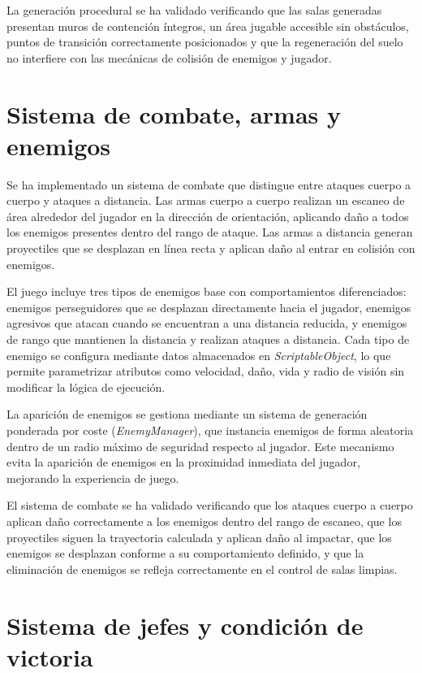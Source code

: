 La generación procedural se ha validado verificando que las salas generadas presentan muros de contención íntegros, un área jugable accesible sin obstáculos, puntos de transición correctamente posicionados y que la regeneración del suelo no interfiere con las mecánicas de colisión de enemigos y jugador.

\section{Sistema de combate, armas y enemigos}

Se ha implementado un sistema de combate que distingue entre ataques cuerpo a cuerpo y ataques a distancia. Las armas cuerpo a cuerpo realizan un escaneo de área alrededor del jugador en la dirección de orientación, aplicando daño a todos los enemigos presentes dentro del rango de ataque. Las armas a distancia generan proyectiles que se desplazan en línea recta y aplican daño al entrar en colisión con enemigos.

El juego incluye tres tipos de enemigos base con comportamientos diferenciados: enemigos perseguidores que se desplazan directamente hacia el jugador, enemigos agresivos que atacan cuando se encuentran a una distancia reducida, y enemigos de rango que mantienen la distancia y realizan ataques a distancia. Cada tipo de enemigo se configura mediante datos almacenados en \textit{ScriptableObject}, lo que permite parametrizar atributos como velocidad, daño, vida y radio de visión sin modificar la lógica de ejecución.

La aparición de enemigos se gestiona mediante un sistema de generación ponderada por coste (\textit{EnemyManager}), que instancia enemigos de forma aleatoria dentro de un radio máximo de seguridad respecto al jugador. Este mecanismo evita la aparición de enemigos en la proximidad inmediata del jugador, mejorando la experiencia de juego.

El sistema de combate se ha validado verificando que los ataques cuerpo a cuerpo aplican daño correctamente a los enemigos dentro del rango de escaneo, que los proyectiles siguen la trayectoria calculada y aplican daño al impactar, que los enemigos se desplazan conforme a su comportamiento definido, y que la eliminación de enemigos se refleja correctamente en el control de salas limpias.

\section{Sistema de jefes y condición de victoria}

